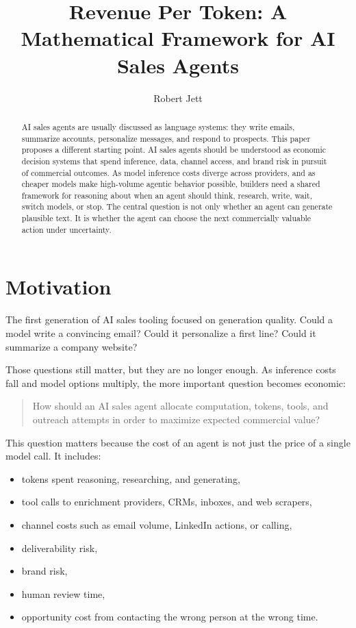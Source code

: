 \documentclass[12pt]{article}
\title{Revenue Per Token: A Mathematical Framework for AI Sales Agents}
\author{Robert Jett}
\date{}
\begin{document}
\maketitle

\begin{abstract}
AI sales agents are usually discussed as language systems: they write emails,
summarize accounts, personalize messages, and respond to prospects. This paper
proposes a different starting point. AI sales agents should be understood as
economic decision systems that spend inference, data, channel access, and brand
risk in pursuit of commercial outcomes. As model inference costs diverge across
providers, and as cheaper models make high-volume agentic behavior possible,
builders need a shared framework for reasoning about when an agent should think,
research, write, wait, switch models, or stop. The central question is not only
whether an agent can generate plausible text. It is whether the agent can choose
the next commercially valuable action under uncertainty.
\end{abstract}

\section{Motivation}

The first generation of AI sales tooling focused on generation quality. Could a
model write a convincing email? Could it personalize a first line? Could it
summarize a company website?

Those questions still matter, but they are no longer enough. As inference costs
fall and model options multiply, the more important question becomes economic:

\begin{quote}
    How should an AI sales agent allocate computation, tokens, tools, and
    outreach attempts in order to maximize expected commercial value?
\end{quote}

This question matters because the cost of an agent is not just the price of a
single model call. It includes:

\begin{itemize}
    \item tokens spent reasoning, researching, and generating,
    \item tool calls to enrichment providers, CRMs, inboxes, and web scrapers,
    \item channel costs such as email volume, LinkedIn actions, or calling,
    \item deliverability risk,
    \item brand risk,
    \item human review time,
    \item opportunity cost from contacting the wrong person at the wrong time.
\end{itemize}
\end{document}
